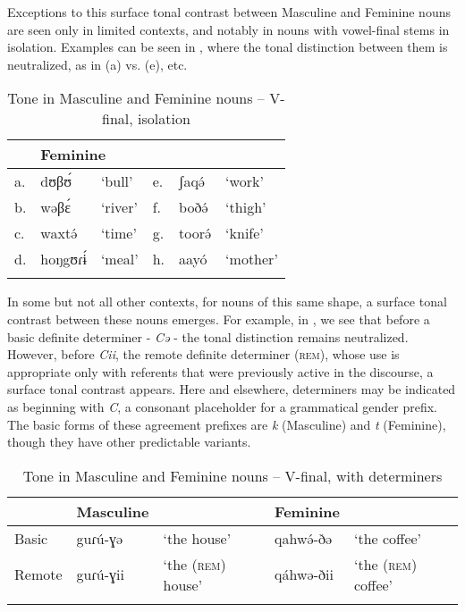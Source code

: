 \documentclass[output=paper,colorlinks,citecolor=brown]{langscibook}
\begin{document}
Exceptions to this surface tonal contrast between Masculine and Feminine nouns are seen only in limited contexts, and notably in nouns with vowel-final stems in isolation. Examples can be seen in , where the tonal distinction between them is  neutralized, as in (a) vs. (e), etc. 

\begin{table}
\caption{Tone in Masculine and Feminine nouns -- V-final, isolation}
\label{tab:MFVfinalIsolation}
 \begin{tabular}{llllll}
  \lsptoprule
  \multicolumn{3}{l}{Masculine}  &  \multicolumn{3}{l}{Feminine}\\
  \midrule
 a. & dʊβʊ́ & `bull' & e. &  ʃaqə́ & `work'\\
 b. & wəβɛ́ & `river' & f. & boðə́ & `thigh' \\
 c. & waxtə́ & `time' & g. & toorə́ & `knife' \\
 d. & hoŋgʊɾɨ́ & `meal' & h. & aayó & `mother' \\
  \lspbottomrule
 \end{tabular}
\end{table}

In some but not all other contexts, for nouns of this same shape, a surface tonal contrast between these nouns emerges. For example, in , we see that before a basic definite determiner - \textit{Cə} - the tonal distinction remains neutralized. However, before \textit{Cii}, the remote definite determiner (\textsc{rem}), whose use is appropriate only with referents that were previously active in the discourse, a surface tonal contrast appears. Here and elsewhere, determiners may be indicated as beginning with \textit{C}, a consonant placeholder for a grammatical gender prefix. The basic forms of these agreement prefixes are \textit{k} (Masculine) and \textit{t} (Feminine), though they have other predictable variants.

\begin{table}
\caption{Tone in Masculine and Feminine nouns -- V-final, with determiners}
\label{tab:MFVFinalDet}
 \begin{tabular}{lllll}
  \lsptoprule
  &     Masculine  &  & Feminine &  \\
  \midrule
Basic &guɾú-ɣə & `the house'  & qahwə́-ðə & `the coffee' \\
Remote & guɾú-ɣii & `the (\textsc{rem}) house' & qáhwə-ðii & `the (\textsc{rem}) coffee' \\
  \lspbottomrule
 \end{tabular}
\end{table}
\end{document}
